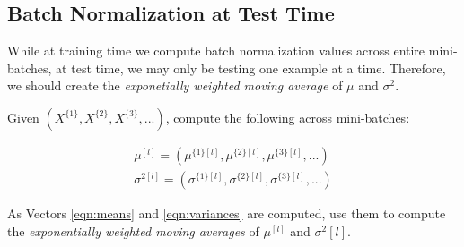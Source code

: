 \documentclass{article}
\begin{document}
\subsection{Batch Normalization at Test Time}

While at training time we compute batch normalization values across entire mini-batches, at test time, we may only be testing one example at a time.  Therefore, we should create the \textit{exponetially weighted moving average} of $\mu$ and $\sigma^2$.

Given $(X^{\{1\}}, X^{\{2\}}, X^{\{3\}}, ...)$, compute the following across mini-batches:

\begin{gather}
\mu^{[l]} = (\mu^{\{1\}[l]}, \mu^{\{2\}[l]}, \mu^{\{3\}[l]}, ...) \label{eqn:means} \\
\sigma^{2[l]} = (\sigma^{\{1\}[l]}, \sigma^{\{2\}[l]}, \sigma^{\{3\}[l]}, ...) \label{eqn:variances}
\end{gather}

As Vectors \ref{eqn:means} and \ref{eqn:variances} are computed, use them to compute the \textit{exponentially weighted moving averages} of $\mu^{[l]}$ and $\sigma^2{[l]}$.
\end{document}
